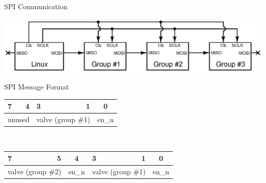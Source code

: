 \documentclass{article}
\begin{document}
\begin{center}

\vspace*{1.0in}

{\fontsize{20}{80}\selectfont SPI Communication} \\
\vspace*{0.5in}

\includegraphics[angle=0,scale=0.80]{../design/xcircuit/expansion_spi}

\vspace*{1.5in}

{\fontsize{20}{80}\selectfont SPI Message Format} \\

\vspace*{0.2in}

{
\renewcommand*\arraystretch{1.5}

\begin{tabular}{l r l r l r }
7 & 4 & 3 & 1 & \multicolumn{2}{c}{0} \\
\hline
\multicolumn{2}{|c|}{\hspace*{6mm} unused \hspace*{6mm}} &
\multicolumn{2}{|c|}{\hspace*{4mm} valve (group \#1) \hspace*{4mm}} &
\multicolumn{2}{|c|}{\hspace*{1mm} en\_n \hspace*{1mm}} \\
\hline
\end{tabular} \\

}

\vspace*{0.5in}

{
\renewcommand*\arraystretch{1.5}

\begin{tabular}{l r l r l r l r }
7 & 5 & \multicolumn{2}{c}{4} & 3 & 1 & \multicolumn{2}{c}{0} \\
\hline
\multicolumn{2}{|c|}{\hspace*{4mm} valve (group \#2) \hspace*{4mm}} &
\multicolumn{2}{|c|}{\hspace*{1mm} en\_n \hspace*{1mm}} &
\multicolumn{2}{|c|}{\hspace*{4mm} valve (group \#1) \hspace*{4mm}} &
\multicolumn{2}{|c|}{\hspace*{1mm} en\_n \hspace*{1mm}} \\
\hline
\end{tabular} \\

}
\end{center}
\end{document}
